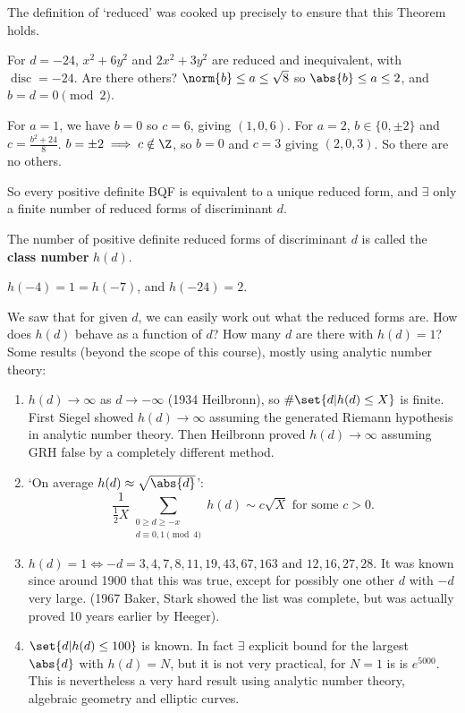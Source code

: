 \documentclass{article}
\DeclareMathOperator{\disc}{disc}
\begin{document}
\begin{remark}
    The definition of `reduced' was cooked up precisely to ensure that this Theorem holds.
\end{remark}

\begin{eg}
    For $d = -24$, $x^2 + 6y^2$ and $2x^2 + 3y^2$ are reduced and inequivalent, with $\disc = -24$.
    Are there others?
    $\norm{b} \leq a \leq \sqrt{8}$ so $\abs{b} \leq a \leq 2$, and $b = d = 0 \pmod{2}$.

    For $a = 1$, we have $b=0$ so $c = 6$, giving $(1, 0, 6)$.
    For $a=2$, $b\in \{0, \pm 2\}$ and $c = \frac{b^2 +24}{8}$. $b = \pm 2 \implies c \notin \Z$, so $b=0$ and $c=3$ giving $(2, 0, 3)$.
    So there are no others.
\end{eg}


So every positive definite BQF is equivalent to a unique reduced form, and $\exists$ only a finite number of reduced forms of discriminant $d$.
\begin{defi}
    The number of positive definite reduced forms of discriminant $d$ is called the \textbf{class number} $h(d)$.
\end{defi}

\begin{eg}
    $h(-4) = 1 = h(-7)$, and $h(-24) = 2$.
\end{eg}

We saw that for given $d$, we can easily work out what the reduced forms are.
How does $h(d)$ behave as a function of $d$?
How many $d$ are there with $h(d) = 1$?
Some results (beyond the scope of this course), mostly using analytic number theory:
\begin{enumerate}
    \item $h(d) \to \infty$ as $d \to -\infty$ (1934 Heilbronn), so $\#\set{d | h(d) \leq X}$ is finite.
        First Siegel showed $h(d) \to \infty$ assuming the generated Riemann hypothesis in analytic number theory.
        Then Heilbronn proved $h(d) \to \infty$ assuming GRH false by a completely different method.
    \item `On average $h(d) \approx \sqrt{\abs{d}}$':
        \begin{equation*}
            \frac{1}{\frac{1}{2} X} \sum_{\substack{0 \geq d \geq -x \\ d\equiv 0,1\pmod{4}}}{h(d)} \sim c \sqrt{X} \text{ for some } c > 0. \tag{(1874, Mertens)}
        \end{equation*}
    \item $h(d) = 1 \iff -d = 3,4,7,8,11,19,43,67,163 \text{ and } 12,16,27,28$.
        It was known since around 1900 that this was true, except for possibly one other $d$ with $-d$ very large.
        (1967 Baker, Stark showed the list was complete, but was actually proved 10 years earlier by Heeger).
    \item $\set{d | h(d) \leq 100}$ is known.
        In fact $\exists$ explicit bound for the largest $\abs{d}$ with $h(d) = N$, but it is not very practical, for $N=1$ is is $e^{5000}$.
        This is nevertheless a very hard result using analytic number theory, algebraic geometry and elliptic curves.
\end{enumerate}
\end{document}
